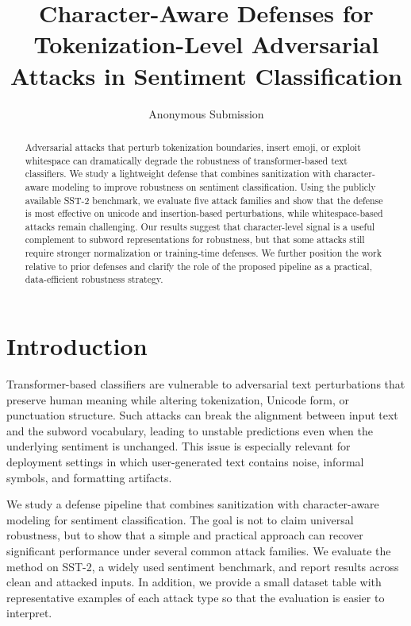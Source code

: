 \documentclass[11pt]{article}
\title{Character-Aware Defenses for Tokenization-Level Adversarial Attacks in Sentiment Classification}
\author{Anonymous Submission}
\date{}
\begin{document}
\maketitle

\begin{abstract}
Adversarial attacks that perturb tokenization boundaries, insert emoji, or exploit whitespace can dramatically degrade the robustness of transformer-based text classifiers. We study a lightweight defense that combines sanitization with character-aware modeling to improve robustness on sentiment classification. Using the publicly available SST-2 benchmark, we evaluate five attack families and show that the defense is most effective on unicode and insertion-based perturbations, while whitespace-based attacks remain challenging. Our results suggest that character-level signal is a useful complement to subword representations for robustness, but that some attacks still require stronger normalization or training-time defenses. We further position the work relative to prior defenses and clarify the role of the proposed pipeline as a practical, data-efficient robustness strategy.
\end{abstract}

\section{Introduction}
Transformer-based classifiers are vulnerable to adversarial text perturbations that preserve human meaning while altering tokenization, Unicode form, or punctuation structure. Such attacks can break the alignment between input text and the subword vocabulary, leading to unstable predictions even when the underlying sentiment is unchanged. This issue is especially relevant for deployment settings in which user-generated text contains noise, informal symbols, and formatting artifacts.

We study a defense pipeline that combines sanitization with character-aware modeling for sentiment classification. The goal is not to claim universal robustness, but to show that a simple and practical approach can recover significant performance under several common attack families. We evaluate the method on SST-2, a widely used sentiment benchmark, and report results across clean and attacked inputs. In addition, we provide a small dataset table with representative examples of each attack type so that the evaluation is easier to interpret.
\end{document}
